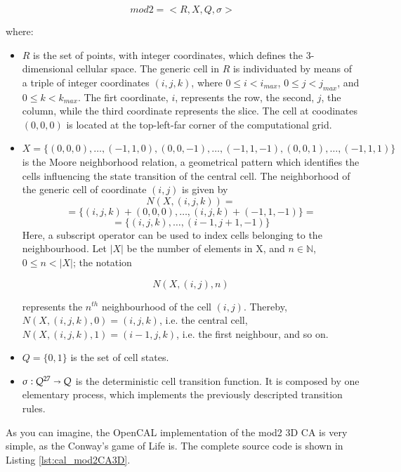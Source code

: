 $$mod2 = < R, X, Q, \sigma >$$

where:

\begin{itemize}

\item $R$ is the set of points, with integer coordinates, which
  defines the 3-dimensional cellular space. The generic cell in $R$ is
  individuated by means of a triple of integer coordinates $(i, j,
  k)$, where $0 \leq i < i_{max}$, $0 \leq j < j_{max}$, and $0 \leq k
  < k_{max}$. The firt coordinate, $i$, represents the row, the
  second, $j$, the column, while the third coordinate represents the
  slice. The cell at coodinates $(0,0,0)$ is located at the
  top-left-far corner of the computational grid.

\item $X = \{(0,0,0), \dots, (-1,1,0), (0,0,-1), \dots, (-1,1,-1),
  (0,0,1), \dots, (-1,1,1)\}$ is the Moore neighborhood
  relation, a geometrical pattern which identifies the cells
  influencing the state transition of the central cell. The
  neighborhood of the generic cell of coordinate $(i, j)$ is given by
  $$N(X, (i, j, k)) = $$
  $$= \{(i, j, k)+(0,0,0), \dots, (i, j, k)+(-1,1,-1)\} =$$
  $$= \{(i, j, k), \dots, (i-1,j+1,-1)\}$$
  Here, a subscript operator can be used to index cells belonging to the
  neighbourhood. Let $|X|$ be the number of elements in X, and $n \in
  \mathbb{N}$, $0 \leq n < |X|$; the notation

  $$N(X, (i, j), n)$$

  represents the $n^{th}$ neighbourhood of the cell $(i,j)$. Thereby,
  $N(X, (i, j, k), 0) = (i, j, k)$, i.e. the central cell, $N(X, (i, j, k), 1)
  = (i-1, j, k)$, i.e. the first neighbour, and so on.
  
\item $Q = \{0, 1\}$ is the set of cell states.
  
\item $\sigma : Q^{27} \shortrightarrow Q$ is the deterministic cell
  transition function. It is composed by one elementary process, which
  implements the previously descripted transition rules.
\end{itemize}


As you can imagine, the OpenCAL implementation of the mod2 3D CA is
very simple, as the Conway's game of Life is. The complete source code
is shown in Listing \ref{lst:cal_mod2CA3D}.



